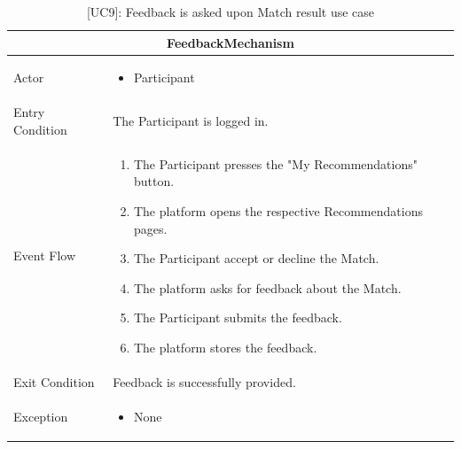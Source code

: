 \begin{table}[H]
    \centering
    \begin{tabular}{|p{3cm}|p{12cm}|}
    \hline
    \multicolumn{2}{|c|}{\textbf{FeedbackMechanism}} \\ \hline
    Actor & 
    \begin{itemize}
        \item Participant
    \end{itemize}\\ \hline
    Entry Condition & The Participant is logged in. \\ \hline
    Event Flow &      
    \begin{enumerate}         
        \item The Participant presses the "My Recommendations" button.
        \item The platform opens the respective Recommendations pages.
        \item The Participant accept or decline the Match.
        \item The platform asks for feedback about the Match.
        \item The Participant submits the feedback.
        \item The platform stores the feedback.
    \end{enumerate} \\ \hline
    Exit Condition & Feedback is successfully provided. \\ \hline
    Exception & 
    \begin{itemize}     
        \item None
    \end{itemize} \\ \hline
    \end{tabular}
    \caption{[UC9]: Feedback is asked upon Match result use case}
    \label{tab:UC9}
\end{table}

